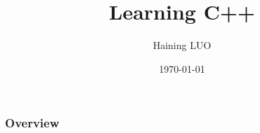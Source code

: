 \documentclass{beamer}
\title[Short title]{Learning C++} %
\author{Haining LUO} %
\institute[] %
{
ECL \\ %
\medskip
\textit{haining.luo@doctorant.ec-lyon.fr} %
}
\date{\today} %
\begin{document}
\begin{frame}
\titlepage %
\end{frame}

\begin{frame}
\frametitle{Overview} %
\tableofcontents %
\end{frame}

\end{document}
